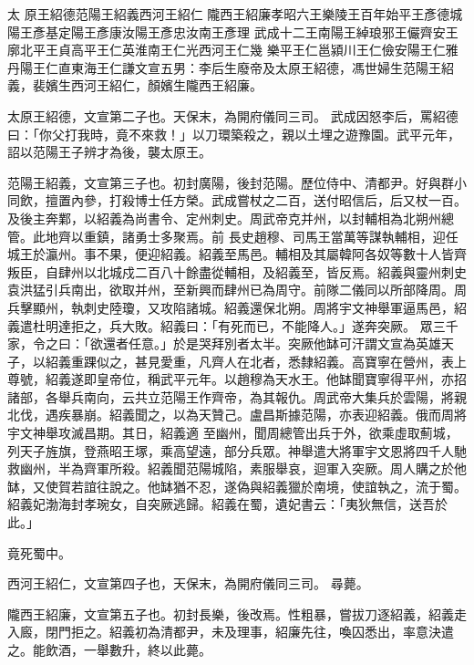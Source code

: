
\begin{pinyinscope}

 太
 原王紹德范陽王紹義西河王紹仁
 隴西王紹廉孝昭六王樂陵王百年始平王彥德城陽王彥基定陽王彥康汝陽王彥忠汝南王彥理
 武成十二王南陽王綽琅邪王儼齊安王廓北平王貞高平王仁英淮南王仁光西河王仁幾
 樂平王仁邕潁川王仁儉安陽王仁雅丹陽王仁直東海王仁謙文宣五男：李后生廢帝及太原王紹德，馮世婦生范陽王紹義，裴嬪生西河王紹仁，顏嬪生隴西王紹廉。



 太原王紹德，文宣第二子也。天保末，為開府儀同三司。
 武成因怒李后，罵紹德曰：「你父打我時，竟不來救！」以刀環築殺之，親以土埋之遊豫園。武平元年，詔以范陽王子辨才為後，襲太原王。



 范陽王紹義，文宣第三子也。初封廣陽，後封范陽。歷位侍中、清都尹。好與群小同飲，擅置內參，打殺博士任方榮。武成嘗杖之二百，送付昭信后，后又杖一百。及後主奔鄴，以紹義為尚書令、定州刺史。周武帝克并州，以封輔相為北朔州總管。此地齊以重鎮，諸勇士多聚焉。前
 長史趙穆、司馬王當萬等謀執輔相，迎任城王於瀛州。事不果，便迎紹義。紹義至馬邑。輔相及其屬韓阿各奴等數十人皆齊叛臣，自肆州以北城戍二百八十餘盡從輔相，及紹義至，皆反焉。紹義與靈州刺史袁洪猛引兵南出，欲取并州，至新興而肆州已為周守。前隊二儀同以所部降周。周兵擊顯州，執刺史陸瓊，又攻陷諸城。紹義還保北朔。周將宇文神舉軍逼馬邑，紹義遣杜明達拒之，兵大敗。紹義曰：「有死而已，不能降人。」遂奔突厥。
 眾三千家，令之曰：「欲還者任意。」於是哭拜別者太半。突厥他缽可汗謂文宣為英雄天子，以紹義重踝似之，甚見愛重，凡齊人在北者，悉隸紹義。高寶寧在營州，表上尊號，紹義遂即皇帝位，稱武平元年。以趙穆為天水王。他缽聞寶寧得平州，亦招諸部，各舉兵南向，云共立范陽王作齊帝，為其報仇。周武帝大集兵於雲陽，將親北伐，遇疾暴崩。紹義聞之，以為天贊己。盧昌斯據范陽，亦表迎紹義。俄而周將宇文神舉攻滅昌期。其日，紹義適
 至幽州，聞周總管出兵于外，欲乘虛取薊城，列天子旌旗，登燕昭王塚，乘高望遠，部分兵眾。神舉遣大將軍宇文恩將四千人馳救幽州，半為齊軍所殺。紹義聞范陽城陷，素服舉哀，迴軍入突厥。周人購之於他缽，又使賀若誼往說之。他缽猶不忍，遂偽與紹義獵於南境，使誼執之，流于蜀。紹義妃渤海封孝琬女，自突厥逃歸。紹義在蜀，遺妃書云：「夷狄無信，送吾於此。」



 竟死蜀中。



 西河王紹仁，文宣第四子也，天保末，為開府儀同三司。
 尋薨。



 隴西王紹廉，文宣第五子也。初封長樂，後改焉。性粗暴，嘗拔刀逐紹義，紹義走入廄，閉門拒之。紹義初為清都尹，未及理事，紹廉先往，喚囚悉出，率意決遣之。能飲酒，一舉數升，終以此薨。




\end{pinyinscope}
